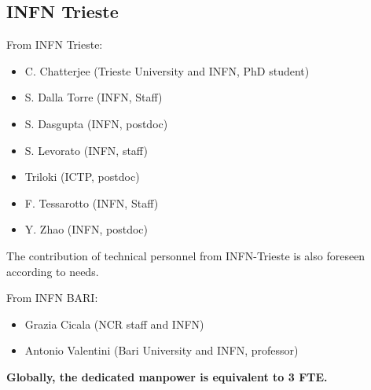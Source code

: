 \subsection{INFN Trieste} 
From INFN Trieste:
\begin {itemize}
\item C. Chatterjee (Trieste University and INFN, PhD student)
\item S. Dalla Torre (INFN, Staff)
\item S. Dasgupta (INFN, postdoc) 
\item S. Levorato (INFN, staff)
\item Triloki  (ICTP, postdoc)
\item F. Tessarotto (INFN, Staff)
\item Y. Zhao (INFN, postdoc)
\end{itemize}
The contribution of technical personnel from INFN-Trieste is also foreseen according to needs.
\par
From INFN BARI:
\begin {itemize}
\item Grazia Cicala (NCR staff and INFN)
\item Antonio Valentini (Bari University and INFN, professor)
\end{itemize}
\par
\textbf{Globally, the dedicated manpower is equivalent to 3 FTE.}